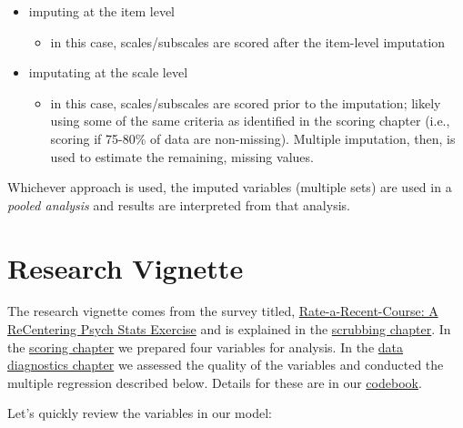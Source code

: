 \documentclass[
  english,
]{book}
\providecommand{\tightlist}{%
  \setlength{\itemsep}{0pt}\setlength{\parskip}{0pt}}
\begin{document}
\begin{itemize}
\tightlist
\item
  imputing at the item level

  \begin{itemize}
  \tightlist
  \item
    in this case, scales/subscales are scored after the item-level imputation
  \end{itemize}
\item
  imputating at the scale level

  \begin{itemize}
  \tightlist
  \item
    in this case, scales/subscales are scored prior to the imputation; likely using some of the same criteria as identified in the scoring chapter (i.e., scoring if 75-80\% of data are non-missing). Multiple imputation, then, is used to estimate the remaining, missing values.
  \end{itemize}
\end{itemize}

Whichever approach is used, the imputed variables (multiple sets) are used in a \emph{pooled analysis} and results are interpreted from that analysis.

\hypertarget{research-vignette-3}{%
\section{Research Vignette}\label{research-vignette-3}}

The research vignette comes from the survey titled, \href{https://spupsych.az1.qualtrics.com/jfe/form/SV_b2cClqAlLGQ6nLU}{Rate-a-Recent-Course: A ReCentering Psych Stats Exercise} and is explained in the \protect\hyperlink{scrub}{scrubbing chapter}. In the \protect\hyperlink{score}{scoring chapter} we prepared four variables for analysis. In the \protect\hyperlink{DataDx}{data diagnostics chapter} we assessed the quality of the variables and conducted the multiple regression described below. Details for these are in our \href{./Rate-a-Course_Codebook.pdf}{codebook}.

Let's quickly review the variables in our model:
\end{document}
